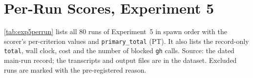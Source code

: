 \documentclass[11pt,a4paper]{article}
\begin{document}
\begin{table}[h]
\centering\small
\caption{\small \textbf{Excluded runs (Experiment 5).} Fragment \texttt{tables/table\_exclusions.tex}, copied verbatim from the analysis output. Overlap is the Jaccard similarity of each query draft's cited identifiers against the vendored PHP node-type vocabulary; it is descriptive and not an exclusion trigger.}
\label{tab:exp5exclusions}

\end{table}

\section{Per-Run Scores, Experiment 5}
\label{app:exp5}

\autoref{tab:exp5perrun} lists all 80 runs of Experiment~5 in spawn order with the scorer's per-criterion values and \texttt{primary\_total} (PT). It also lists the record-only \texttt{total}, wall clock, cost and the number of blocked \texttt{gh} calls. Source: the dated main-run record; the transcripts and output files are in the dataset. Excluded runs are marked with the pre-registered reason.
\end{document}
